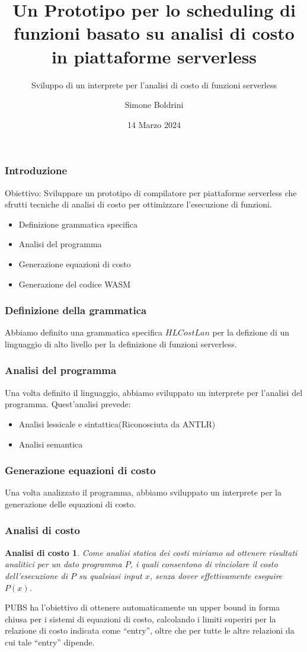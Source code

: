 \documentclass[xcolor=dvipsnames]{beamer}
\title[CostCompiler]{Un Prototipo per lo scheduling di funzioni basato su analisi di costo in piattaforme serverless}
\subtitle{Sviluppo di un interprete per l'analisi di costo di funzioni serverless}
\author{Simone Boldrini}
\date{14 Marzo 2024}
\institute[]{Alma Mater Studiorum - Università di Bologna \\ Facoltà di Scienze}
\begin{document}
\begin{frame}
    \titlepage
\end{frame}

\begin{frame}
    \frametitle{Introduzione}
    \alert{Obiettivo}: Sviluppare un prototipo di compilatore per piattaforme serverless che sfrutti tecniche di analisi di costo per ottimizzare l'esecuzione di funzioni.
    \begin{itemize}
        \item<1-> Definizione grammatica specifica 
        \item<2-> Analisi del programma
        \item<3-> Generazione equazioni di costo 
        \item<4-> Generazione del codice WASM
    \end{itemize}
\end{frame}
\begin{frame}
    \frametitle{Definizione della grammatica}
    Abbiamo definito una grammatica specifica $HLCostLan$ per la defizione di un linguaggio di alto livello per la definizione di funzioni serverless.
\end{frame}
\begin{frame}
    \frametitle{Analisi del programma}
    Una volta definito il linguaggio, abbiamo sviluppato un interprete per l'analisi del programma.
    Quest'analisi prevede:
    \begin{itemize}
        \item<1-> Analisi lessicale e sintattica(Riconosciuta da ANTLR)
        \item<2-> Analisi semantica 
    \end{itemize}
\end{frame}
\begin{frame}
    \frametitle{Generazione equazioni di costo}
    Una volta analizzato il programma, abbiamo sviluppato un interprete per la generazione delle equazioni di costo.
\end{frame}
\begin{frame}
    \frametitle{Analisi di costo}
    
    \newtheorem{Analisi di costo}{Analisi di costo}

    \begin{Analisi di costo}
        Come \alert{analisi statica dei costi} miriamo ad ottenere risultati analitici per un dato programma $P$, i quali consentono di vinciolare il costo dell'esecuzione di $P$ su qualsiasi input $x$, senza dover effettivamente eseguire $P(x)$.
    \end{Analisi di costo}
   
    PUBS ha l'obiettivo di ottenere automaticamente un upper bound in forma chiusa per i sistemi di equazioni di costo, calcolando i limiti superiri per la relazione di costo indicata come ``entry'', oltre che per tutte le altre relazioni da cui tale ``entry'' dipende.
\end{frame}
\end{document}
